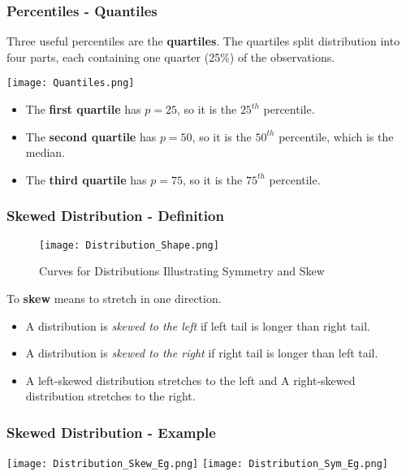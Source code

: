 \documentclass[11pt, xcolor=x11names,compress]{beamer}
\begin{document}
\begin{frame}[fragile,t]
\frametitle{Percentiles - Quantiles}
Three useful percentiles are the \textbf{quartiles}. The quartiles split distribution into four parts, each containing one quarter (25\%) of the observations. 

\begin{center}
    \texttt{[image: Quantiles.png]}
\end{center}

\begin{itemize}
    \item The \textbf{first quartile} has $p = 25$, so it is the $25^{th}$ percentile.
    \item The \textbf{second quartile} has $p = 50$, so it is the $50^{th}$ percentile, which is the median.
    \item The \textbf{third quartile} has $p = 75$, so it is the $75^{th}$ percentile. 
\end{itemize}
\hyperlink{a1)}{}
\end{frame}

\begin{frame}[fragile,t]
\frametitle{Skewed Distribution - Definition}
\begin{figure}
    \centering
    \texttt{[image: Distribution\_Shape.png]}
    \caption{Curves for Distributions Illustrating Symmetry and Skew}
    \label{fig:my_label}
\end{figure}

To \textbf{skew} means to stretch in one direction.
\begin{itemize}
    \item A distribution is \textit{skewed to the left} if left tail is longer than right tail.
    \item A distribution is \textit{skewed to the right} if right tail is longer than left tail.
    \item A left-skewed distribution stretches to the left and A right-skewed distribution stretches to the right.
\end{itemize}
\hyperlink{a1)}{}
\end{frame}
\begin{frame}[fragile,t]
\frametitle{Skewed Distribution - Example}
\begin{center}
    \texttt{[image: Distribution\_Skew\_Eg.png]}
    \texttt{[image: Distribution\_Sym\_Eg.png]}
\end{center}
\hyperlink{a1)}{}
\end{frame}
\end{document}
